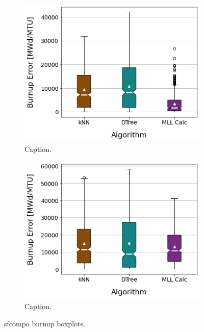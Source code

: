 \begin{figure}[!ht]
    \centering
    \begin{subfigure}[b]{0.49\textwidth}
        \centering
        \includegraphics[width=\textwidth]{./chapters/exp1/sfcompo_boxplots_impnull_burn.png}
        \caption[]{Caption.}
    \end{subfigure}
    \hfill
    \begin{subfigure}[b]{0.49\textwidth}
        \centering
        \includegraphics[width=\textwidth]{./chapters/exp1/sfcompo_boxplots_0null_burn.png}
        \caption[]{Caption.}
    \end{subfigure}
    \caption{sfcompo burnup boxplots.}
    \label{fig:sfcoburn}
\end{figure}


